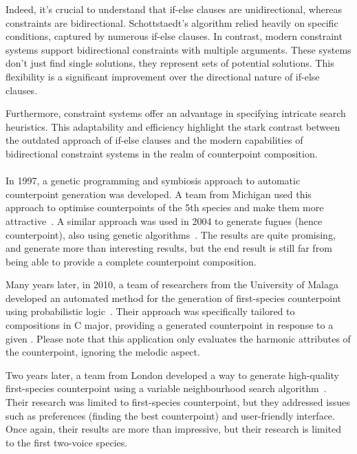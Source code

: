 Indeed, it's crucial to understand that if-else clauses are unidirectional, whereas constraints are bidirectional. Schottstaedt's algorithm relied heavily on specific conditions, captured by numerous if-else clauses. In contrast, modern constraint systems support bidirectional constraints with multiple arguments. These systems don't just find single solutions, they represent sets of potential solutions. This flexibility is a significant improvement over the directional nature of if-else clauses.

Furthermore, constraint systems offer an advantage in specifying intricate search heuristics. This adaptability and efficiency highlight the stark contrast between the outdated approach of if-else clauses and the modern capabilities of bidirectional constraint systems in the realm of counterpoint composition.

\paragraph{}
In 1997, a genetic programming and symbiosis approach to automatic counterpoint generation was developed. A team from Michigan used this approach to optimise counterpoints of the 5th species and make them more attractive~\cite{polito1997musica}. A similar approach was used in 2004 to generate fugues (hence counterpoint), also using genetic algorithms~\cite{garay2004fugue}. The results are quite promising, and generate more than interesting results, but the end result is still far from being able to provide a complete counterpoint composition.

Many years later, in 2010, a team of researchers from the University of Malaga developed an automated method for the generation of first-species counterpoint using probabilistic logic~\cite{Aguilera2010}. Their approach was specifically tailored to compositions in C major, providing a generated counterpoint in response to a given \cf. Please note that this application only evaluates the harmonic attributes of the counterpoint, ignoring the melodic aspect.

Two years later, a team from London developed a way to generate high-quality first-species counterpoint using a variable neighbourhood search algorithm~\cite{Herremans2012}. Their research was limited to first-species counterpoint, but they addressed issues such as preferences (finding the best counterpoint) and user-friendly interface. Once again, their results are more than impressive, but their research is limited to the first two-voice species.


